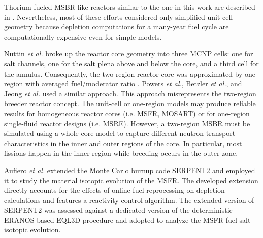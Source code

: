 Thorium-fueled \gls{MSBR}-like reactors similar to the one in this work are 
described in \cite{park_whole_2015, 
jeong_equilibrium_2016,powers_new_2013,powers_inventory_2014, 
betzler_molten_2017,rykhlevskii_online_2017,nuttin_potential_2005}. 
Nevertheless, most of these efforts considered only simplified unit-cell 
geometry because depletion computations for a many-year fuel cycle are 
computationally expensive even for simple models. 

Nuttin \emph{et al.} broke up the reactor core geometry into three \gls{MCNP} cells: 
one for salt channels, one for the salt plena above and below the core, and a 
third cell for the annulus. Consequently, the two-region reactor core was 
approximated by one region with averaged fuel/moderator ratio 
\cite{nuttin_potential_2005}.  Powers \emph{et 
al.}, Betzler \emph{et al.}, and Jeong \emph{et al.} 
\cite{powers_new_2013,powers_inventory_2014,betzler_modeling_2016, 
betzler_molten_2017, jeong_development_2014, jeong_equilibrium_2016} used a 
similar approach. This approach 
misrepresents the two-region breeder reactor concept. The unit-cell or one-region 
models may produce reliable results for homogeneous reactor cores (i.e. 
\gls{MSFR}, \gls{MOSART}) or for one-region single-fluid reactor designs (i.e. 
\gls{MSRE}). However, a two-region \gls{MSBR} must be simulated using a whole-core 
model to capture different neutron transport characteristics in the inner and 
outer regions of the core. In particular, most fissions happen in the inner 
region while breeding occurs in the outer zone.  

Aufiero \emph{et al.} extended the Monte Carlo burnup code SERPENT2 and 
employed it to study the material isotopic evolution of the 
\gls{MSFR}\cite{aufiero_extended_2013}. The 
developed extension directly accounts for the effects of online fuel 
reprocessing on depletion calculations and features a reactivity control 
algorithm. The extended version of SERPENT2 was assessed against a dedicated 
version of the deterministic ERANOS-based EQL3D procedure 
\cite{ruggieri_eranos_2006, fiorina_investigation_2013} and adopted to analyze 
the \gls{MSFR} fuel salt isotopic evolution. 

